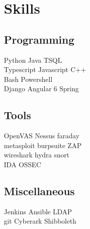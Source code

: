 \documentclass[letterpaper]{deedy-resume} %
\begin{document}
\begin{minipage}[t]{0.28\textwidth}



\section{Skills}

\subsection{Programming}

Python \textbullet{} Java \textbullet{} TSQL \\
Typescript \textbullet{} Javascript \textbullet{} C++ \\
Bash \textbullet{} Powershell \\
Django \textbullet{} Angular 6 \textbullet{} Spring

\sectionspace %

\subsection{Tools}
OpenVAS \textbullet{} Nessus \textbullet{} faraday \\
metasploit \textbullet{} burpsuite \textbullet{} ZAP \\
wireshark \textbullet{} hydra \textbullet{} snort \\
IDA \textbullet{} OSSEC

\sectionspace %

\subsection{Miscellaneous}
Jenkins \textbullet{} Ansible \textbullet{} LDAP \\
git \textbullet{} Cyberark  \textbullet{} Shibboleth



\end{minipage}
\end{document}
